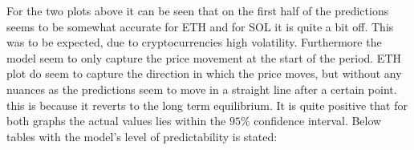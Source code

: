 \noindent For the two plots above it can be seen that on the first half of the predictions seems to be somewhat accurate for ETH and for SOL it is quite a bit off. This was to be expected, due to cryptocurrencies high volatility. Furthermore the model seem to only capture the price movement at the start of the period. ETH plot do seem to capture the direction in which the price moves, but without any nuances as the predictions seem to move in a straight line after a certain point. this is because it reverts to the long term equilibrium. It is quite positive that for both graphs the actual values lies within the $95\%$ confidence interval. Below tables with the model's level of predictability is stated:

